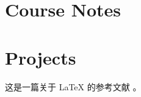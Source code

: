 \documentclass[
	draftmark = true,   %
	coverpage = cover.pdf,
    geometry = a4,    %
	fontsetup = font-setup-open.tex,
	titlesetup = titles-setup.tex
]{AJbook}
\numberwithin{equation}{section}
\begin{document}
	\frontmatter	%
	
	\mainmatter		%

	

	\part{Course Notes}

	

	\part{Projects}
	
	
	这是一篇关于 LaTeX 的参考文献 \cite{lamport1994latex}。

	

	\backmatter
	\printbibliography[heading=bibintoc]
	
	\listoffigures
	\listoftables

	{\footnotesize
	\printindex}
\end{document}
